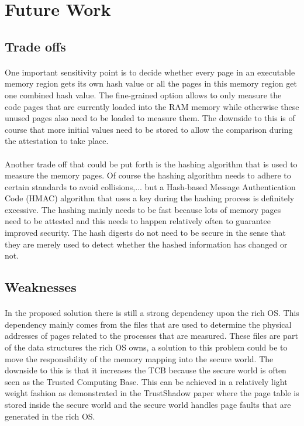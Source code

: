 \section{Future Work}

\subsection*{Trade offs}

\paragraph*{}
One important sensitivity point is to decide whether every page in an executable memory region gets its own hash value or all the pages in this memory region get one combined hash value. The fine-grained option allows to only measure the code pages that are currently loaded into the RAM memory while otherwise these unused pages also need to be loaded to measure them. The downside to this is of course that more initial values need to be stored to allow the comparison during the attestation to take place.

\paragraph*{}
Another trade off that could be put forth is the hashing algorithm that is used to measure the memory pages. Of course the hashing algorithm needs to adhere to certain standards to avoid collisions,... but a Hash-based Message Authentication Code (HMAC) algorithm that uses a key during the hashing process is definitely excessive. The hashing mainly needs to be fast because lots of memory pages need to be attested and this needs to happen relatively often to guarantee improved security. The hash digests do not need to be secure in the sense that they are merely used to detect whether the hashed information has changed or not.

\subsection*{Weaknesses}

\paragraph*{}
In the proposed solution there is still a strong dependency upon the rich OS. This dependency mainly comes from the files that are used to determine the physical addresses of pages related to the processes that are measured. These files are part of the data structures the rich OS owns, a solution to this problem could be to move the responsibility of the memory mapping into the secure world. The downside to this is that it increases the TCB because the secure world is often seen as the Trusted Computing Base. This can be achieved in a relatively light weight fashion as demonstrated in the TrustShadow paper where the page table is stored inside the secure world and the secure world handles page faults that are generated in the rich OS. 

